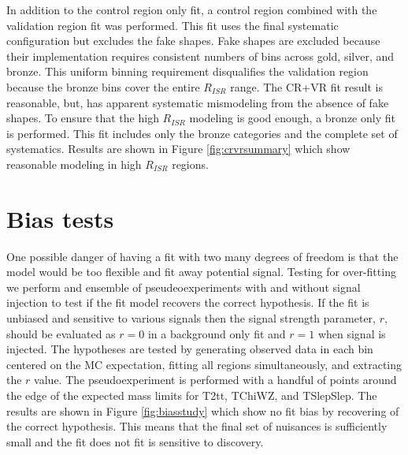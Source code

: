 


In addition to the control region only fit, a control region combined with the validation region fit was performed. This fit uses the final systematic configuration but excludes the fake shapes. Fake shapes are excluded because their implementation requires consistent numbers of bins across gold, silver, and bronze. This uniform binning requirement disqualifies the validation region because the bronze bins cover the entire $R_{ISR}$ range. The CR+VR fit result is reasonable, but, has apparent systematic mismodeling from the absence of fake shapes.  To ensure that the high $R_{ISR}$ modeling is good enough, a bronze only fit is performed. This fit includes only the bronze categories and the complete set of systematics. Results are shown in Figure \ref{fig:crvrsummary} which show reasonable modeling in high $R_{ISR}$ regions.

\section{Bias tests}

One possible danger of having a fit with two many degrees of freedom is that the model would be too flexible and fit away potential signal. Testing for over-fitting we perform and ensemble of pseudeoexperiments with and without signal injection to test if the fit model recovers the correct hypothesis.  If the fit is unbiased and sensitive to various signals then the signal strength parameter, $r$, should be evaluated as $r=0$ in a background only fit and $r=1$ when signal is injected.  The hypotheses are tested by generating observed data in each bin centered on the MC expectation, fitting all regions simultaneously, and extracting the $r$ value. The pseudoexperiment is performed with a handful of points around the edge of the expected mass limits for T2tt, TChiWZ, and TSlepSlep. The results are shown in Figure \ref{fig:biasstudy} which show no fit bias by recovering of the correct hypothesis. This means that the final set of nuisances is sufficiently small and the fit does not fit is sensitive to discovery.

